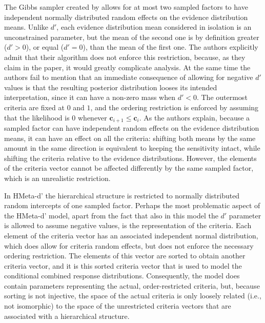 \documentclass[oneside,a4paper]{article}
\begin{document}
The Gibbs sampler created by  allows for
at most two sampled factors to have independent normally distributed
random effects on the evidence distribution means. Unlike $d'$, each
evidence distribution mean considered in isolation is an unconstrained
parameter, but the mean of the second one is by definition greater
($d' > 0$), or equal ($d' = 0$), than the mean of the first one. The
authors explicitly admit that their algorithm does not enforce this
restriction, because, as they claim in the paper, it would greatly
complicate analysis. At the same time the authors fail to mention that
an immediate consequence of allowing for negative $d'$ values is that
the resulting posterior distribution looses its intended
interpretation, since it can have a non-zero mass when $d' < 0$. The
outermost criteria are fixed at $0$ and $1$, and the ordering
restriction is enforced by assuming that the likelihood is $0$
whenever $\bm{c}_{i+1} \leq \bm{c}_i$. As the authors explain, because
a sampled factor can have independent random effects on the evidence
distribution means, it can have an effect on all the criteria:
shifting both means by the same amount in the same direction is
equivalent to keeping the sensitivity intact, while shifting the
criteria relative to the evidence distributions. However, the elements
of the criteria vector cannot be affected differently by the same
sampled factor, which is an unrealistic restriction.

In HMeta-d' the hierarchical structure is restricted to normally
distributed random intercepts of one sampled factor. Perhaps the most
problematic aspect of the HMeta-d' model, apart from the fact that
also in this model the $d'$ parameter is allowed to assume negative
values, is the representation of the criteria. Each element of the
criteria vector has an associated independent normal distribution,
which does allow for criteria random effects, but does not enforce the
necessary ordering restriction. The elements of this vector are sorted
to obtain another criteria vector, and it is this sorted criteria
vector that is used to model the conditional combined response
distributions. Consequently, the model does contain parameters
representing the actual, order-restricted criteria, but, because
sorting is not injective, the
space of the actual criteria is only loosely related (i.e., not
isomorphic) to the space of the unrestricted criteria vectors that are
associated with a hierarchical structure.

\end{document}
